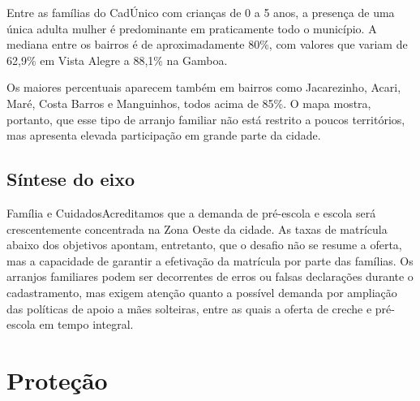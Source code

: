 Entre as famílias do CadÚnico com crianças de 0 a 5 anos, a presença de uma única adulta mulher é predominante em praticamente todo o município. A mediana entre os bairros é de aproximadamente 80\%, com valores que variam de 62,9\% em Vista Alegre a 88,1\% na Gamboa.

Os maiores percentuais aparecem também em bairros como Jacarezinho, Acari, Maré, Costa Barros e Manguinhos, todos acima de 85\%. O mapa mostra, portanto, que esse tipo de arranjo familiar não está restrito a poucos territórios, mas apresenta elevada participação em grande parte da cidade.


\section{Síntese do eixo}

\begin{sintese}{Família e Cuidados}Acreditamos que a demanda de pré-escola e escola será crescentemente concentrada na Zona Oeste da cidade. As taxas de matrícula abaixo dos objetivos apontam, entretanto, que o desafio não se resume a oferta, mas a capacidade de garantir a efetivação da matrícula por parte das famílias. Os arranjos familiares podem ser decorrentes de erros ou falsas declarações durante o cadastramento, mas exigem atenção quanto a possível demanda por ampliação das políticas de apoio a mães solteiras, entre as quais a oferta de creche e pré-escola em tempo integral.\end{sintese}


\chapter{Proteção}\label{cap:eixo-4}

